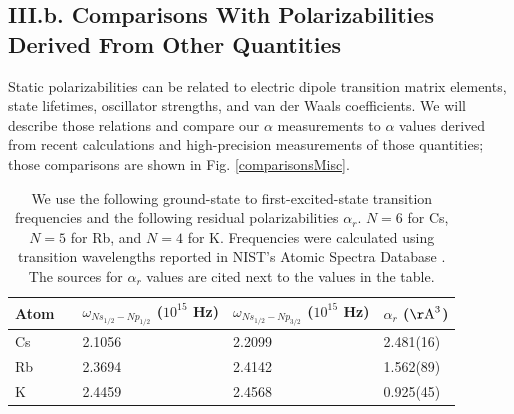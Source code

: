\documentclass[twocolumn,prl,showpacs,superscriptaddress]{revtex4-1}   %
\newcommand{\figref}[1]{Fig. \ref{#1}}
\newcommand{\AAA}{\mathrm{\AA}}
\begin{document}
\subsection{III.b. Comparisons With Polarizabilities Derived From Other Quantities}

Static polarizabilities can be related to electric dipole transition matrix elements, state lifetimes, oscillator strengths, and van der Waals coefficients. We will describe those relations and compare our $\alpha$ measurements to $\alpha$ values derived from recent calculations and high-precision measurements of those quantities; those comparisons are shown in \figref{comparisonsMisc}.

\begingroup
\begin{table}
\caption{\label{tableOmegaRes}We use the following ground-state to first-excited-state transition frequencies and the following residual polarizabilities $\alpha_r$.
$N = 6$ for Cs, $N = 5$ for Rb, and $N = 4$ for K.
Frequencies were calculated using transition wavelengths reported in NIST's Atomic Spectra Database \cite{NIST}.
The sources for $\alpha_r$ values are cited next to the values in the table.}
\begin{center}
\begin{tabularx}{\linewidth}{lXXl}
\hline\hline
Atom$\quad$ & $\omega_{Ns_{1/2}-Np_{1/2}}$ ($10^{15}$ Hz) & $\omega_{Ns_{1/2}-Np_{3/2}}$ ($10^{15}$ Hz) & $\alpha_r$ ($\AAA^3$) \\
\hline
Cs & 2.1056 & 2.2099 & 2.481(16) \cite{Derevianko2001} \\
Rb & 2.3694 & 2.4142 & 1.562(89) \cite{Safronova2006} \\
K  & 2.4459 & 2.4568 & 0.925(45) \cite{Safronova2006} \\
\hline\hline
\end{tabularx}
\end{center}
\end{table}
\endgroup
\end{document}
